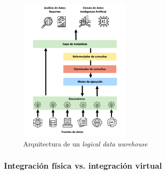 \begin{figure}[h!]
    \centering
    \includegraphics[width=0.5\textwidth]{Images/ldw-architecture.png}
    \caption{Arquitectura de un \textit{logical data warehouse}}
    \label{fig:ldw-architecture}
\end{figure}

\subsubsection{Integración física vs. integración virtual}

